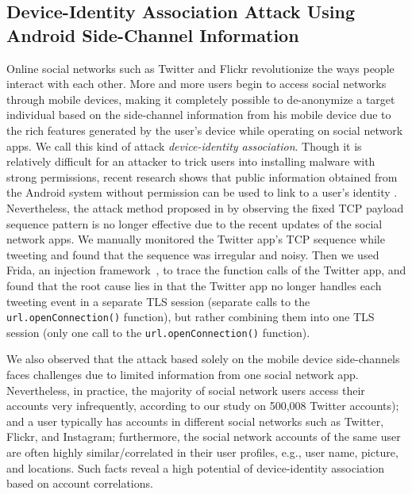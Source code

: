\documentclass[letterpaper,12pt]{article}
\begin{document}
\subsection{Device-Identity Association Attack Using Android Side-Channel Information}
Online social networks such as Twitter and Flickr revolutionize the ways people interact with each other. More and more users begin to access social networks through mobile devices, making it completely possible to de-anonymize a target individual based on the side-channel information from his mobile device due to the rich features generated by the user's device while operating on social network apps. We call this kind of attack \emph{device-identity association}. Though it is relatively difficult for an attacker to trick users into installing malware with strong permissions, recent research shows that public information obtained from the Android system without permission can be used to link to a user's identity \cite{zhou2013identity}. Nevertheless, the attack method proposed in \cite{zhou2013identity} by observing the fixed TCP payload sequence pattern is no longer effective due to the recent updates of the social network apps. We manually monitored the Twitter app's TCP sequence while tweeting and found that the sequence was irregular and noisy. Then we used Frida, an injection framework~\cite{frida}, to trace the function calls of the Twitter app, and found that the root cause lies in that the Twitter app no longer handles each tweeting event in a separate TLS session (separate calls to the \texttt{url.openConnection()} function), but rather combining them into one TLS session (only one call to the \texttt{url.openConnection()} function).

We also observed that the attack based solely on the mobile device side-channels faces challenges due to limited information from one social network app. Nevertheless, in practice, the majority of social network users access their accounts very infrequently, according to our study on 500,008 Twitter accounts); and a user typically has accounts in different social networks such as Twitter, Flickr, and Instagram; furthermore, the social network accounts of the same user are often highly similar/correlated in their user profiles, e.g., user name, picture, and locations. Such facts reveal a high potential of device-identity association based on account correlations. 
\end{document}
